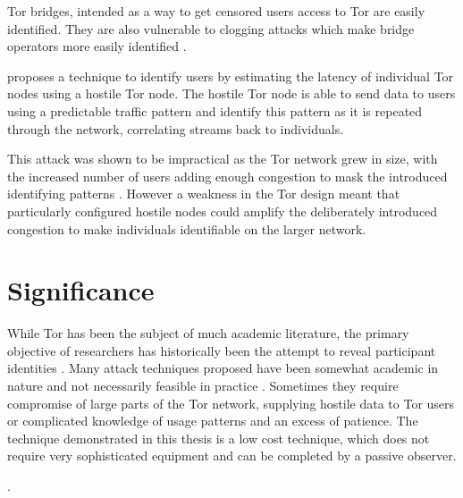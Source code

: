 \documentclass[conference]{IEEEtran}
\begin{document}
Tor bridges, intended as a way to get censored users access to Tor are easily
identified. They are also vulnerable to clogging attacks which make bridge
operators more easily identified \textcite{McLachlan:2009p197}.

\textcite{Murdoch:2005p325} proposes a technique to identify users by estimating
the latency of individual Tor nodes using a hostile Tor node. The hostile Tor
node is able to send data to users using a predictable traffic pattern and
identify this pattern as it is repeated through the network, correlating streams
back to individuals.

This attack was shown to be impractical as the Tor network grew in size, with
the increased number of users adding enough congestion to mask the introduced
identifying patterns \parencite{Evans:2009p315}. However a weakness in the Tor
design meant that particularly configured hostile nodes could amplify the
deliberately introduced congestion to make individuals identifiable on the
larger network.

\section{Significance}

While Tor has been the subject of much academic literature, the primary
objective of researchers has historically been the attempt to reveal participant
identities \parencite[3]{Murdoch:2005p325}.  Many attack techniques proposed
have been somewhat academic in nature and not necessarily feasible in practice
\parencite{Raccoon:2008fk}. Sometimes they require compromise of large parts of
the Tor network, supplying hostile data to Tor users or complicated knowledge of
usage patterns and an excess of patience. The technique demonstrated in this
thesis is a low cost technique, which does not require very sophisticated
equipment and can be completed by a passive observer.

\parencite[5]{Dingledine:2004p314}.

\printbibliography
\end{document}
